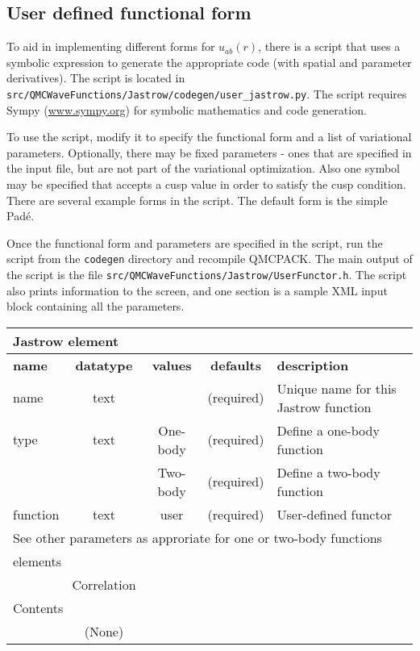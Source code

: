 \subsection{User defined functional form}
\label{sec:jastrowuserform}

To aid in implementing different forms for $u_{ab}(r)$, there is a script that uses a symbolic expression to generate the appropriate code (with spatial and parameter derivatives).
The script is located in \texttt{src/QMCWaveFunctions/Jastrow/codegen/user\_jastrow.py}.
The script requires Sympy (\url{www.sympy.org}) for symbolic mathematics and code generation.

To use the script, modify it to specify the functional form and a list of variational parameters.
Optionally, there may be fixed parameters - ones that are specified in the input file, but are not part of the variational optimization.
Also one symbol may be specified that accepts a cusp value in order to satisfy the cusp condition.
There are several example forms in the script.  The default form is the simple Pad\'e.

Once the functional form and parameters are specified in the script, run the script from the \texttt{codegen} directory and recompile QMCPACK.
The main output of the script is the file \texttt{src/QMCWaveFunctions/Jastrow/UserFunctor.h}.
The script also prints information to the screen, and one section is a sample XML input block containing all the parameters.

\begin{table}[h]
\begin{center}
\begin{tabular}{l c c c l }
\hline
\multicolumn{5}{l}{Jastrow element} \\
\hline
\bfseries name & \bfseries datatype & \bfseries values & \bfseries defaults  & \bfseries description \\
\hline
name & text &    & (required) & Unique name for this Jastrow function \\
type & text & One-body & (required) & Define a one-body function \\
     &      & Two-body & (required) & Define a two-body function \\
function & text & user & (required) & User-defined functor \\
\multicolumn{5}{l}{See other parameters as approriate for one or two-body functions} \\
  \hline
\multicolumn{5}{l}{elements}\\ \hline
& Correlation & & & \\ \hline
\multicolumn{5}{l}{Contents}\\ \hline
& (None)  & & &  \\ \hline
\end{tabular}
\end{center}
\end{table}

